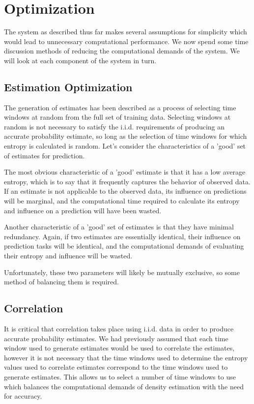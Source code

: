 \documentclass[10pt]{article}
\begin{document}
\section{Optimization}
The system as described thus far makes several assumptions for simplicity which would lead to unnecessary computational performance.  We now spend some time discussion methods of reducing the computational demands of the system.  We will look at each component of the system in turn.

\subsection{Estimation Optimization}
The generation of estimates has been described as a process of selecting time windows at random from the full set of training data.  Selecting windows at random is not necessary to satisfy the i.i.d. requirements of producing an accurate probability estimate, so long as the selection of time windows for which entropy is calculated is random.  Let's consider the characteristics of a 'good' set of estimates for prediction.  

The most obvious characteristic of a 'good' estimate is that it has a low average entropy, which is to say that it frequently captures the behavior of observed data.  If an estimate is not applicable to the observed data, its influence on predictions will be marginal, and the computational time required to calculate its entropy and influence on a prediction will have been wasted.  

Another characteristic of a 'good' set of estimates is that they have minimal redundancy.  Again, if two estimates are essentially identical, their influence on prediction tasks will be identical, and the computational demands of evaluating their entropy and influence will be wasted. 

Unfortunately, these two parameters will likely be mutually exclusive, so some method of balancing them is required.

\subsection{Correlation}
It is critical that correlation takes place using i.i.d. data in order to produce accurate probability estimates.  We had previously assumed that each time window used to generate estimates would be used to correlate the estimates, however it is not necessary that the time windows used to determine the entropy values used to correlate estimates correspond to the time windows used to generate estimates.  This allows us to select a number of time windows to use which balances the computational demands of density estimation with the need for accuracy.
\end{document}
